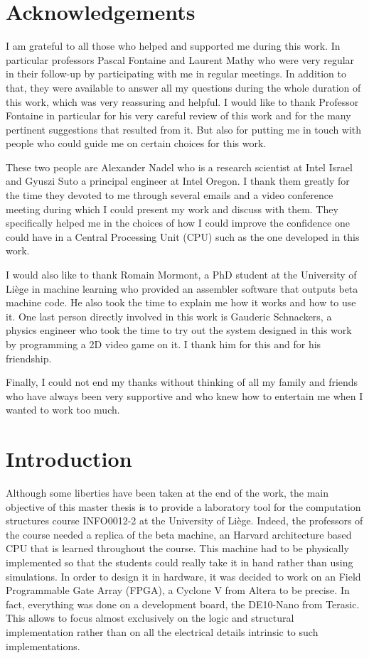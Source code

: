 \chapter*{Acknowledgements}

I am grateful to all those who helped and supported me during this work. In particular professors 
 Pascal Fontaine and Laurent Mathy who were very regular in their follow-up by participating with me 
in regular meetings. In addition to that, they were available to answer all my questions during the 
whole duration of this work, which was very reassuring and helpful. I would like to thank Professor 
Fontaine in particular for his very careful review of this work and for the many pertinent 
suggestions that resulted from it. But also for putting me in touch with people who could guide me 
on certain choices for this work.

These two people are Alexander Nadel who is a research scientist at Intel Israel and Gyuszi 
Suto a principal engineer at Intel Oregon. I thank them greatly for the time they devoted to me through 
several emails and a video conference meeting during which I could present my work and discuss with 
them. They specifically helped me in the choices of how I could 
improve the confidence one could have in a Central Processing Unit (CPU) such as the one developed in this work.

I would also like to thank Romain Mormont, a PhD student at the University of Liège in machine learning
who provided an assembler software that outputs beta machine code. He also took 
the time to explain me how it works and how to use it. One last person directly involved in 
this work is Gauderic Schnackers, a physics engineer who took the time to try out the system 
designed in this work by programming a 2D video game on it. I thank him for this and for his friendship.

Finally, I could not end my thanks without thinking of all my family and friends who have always been 
very supportive and who knew how to entertain me when I wanted to work too much.

\chapter*{Introduction}

Although some liberties have been taken at the end of the work, the main objective of this master thesis
is to provide a laboratory tool for the computation structures course INFO0012-2 at the University of Liège. Indeed, the professors of 
the course needed a replica of the beta machine, an Harvard architecture based CPU that is learned
throughout the course. This machine had to be physically implemented so that the students could 
really take it in hand rather than using simulations. In order to design it in hardware, it was 
decided to work on an Field Programmable Gate Array (FPGA), a Cyclone V from Altera to be precise. In fact, everything was done on a 
development board, the DE10-Nano from Terasic. This allows to focus almost exclusively on the logic and 
structural implementation rather than on all the electrical details intrinsic to such 
implementations.

